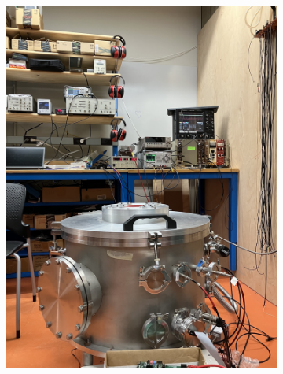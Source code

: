 \begin{figure}
\centering
\begin{subfigure}{.5\textwidth}
  \centering
  \includegraphics[width=\textwidth]{images/saq_wellesley_tpc.jpg}
  \caption{}
\end{subfigure}%
\begin{subfigure}{.5\textwidth}
  \centering

\end{subfigure}
\end{figure}
